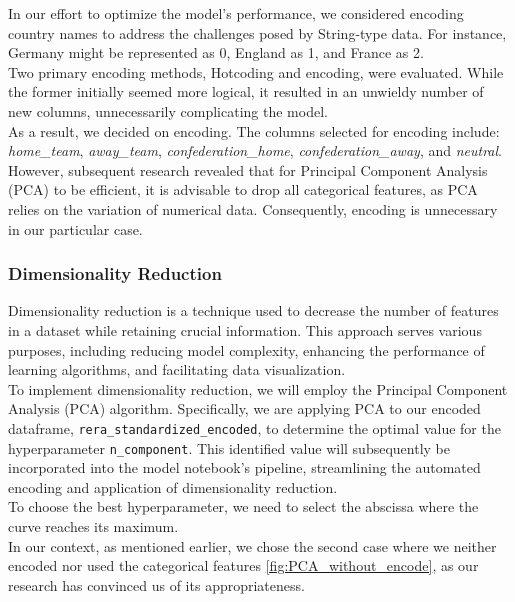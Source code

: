 \documentclass[a4paper,12pt]{article}
\begin{document}
In our effort to optimize the model's performance, we considered encoding country names to address the challenges posed by String-type data. For instance, Germany might be represented as 0, England as 1, and France as 2.\\

Two primary encoding methods, Hotcoding and encoding, were evaluated. While the former initially seemed more logical, it resulted in an unwieldy number of new columns, unnecessarily complicating the model.\\

As a result, we decided on encoding. The columns selected for encoding include: \textit{home\_team}, \textit{away\_team}, \textit{confederation\_home}, \textit{confederation\_away}, and \textit{neutral}.\\

However, subsequent research revealed that for Principal Component Analysis (PCA) to be efficient, it is advisable to drop all categorical features, as PCA relies on the variation of numerical data. Consequently, encoding is unnecessary in our particular case.


\subsubsection{Dimensionality Reduction}

Dimensionality reduction is a technique used to decrease the number of features in a dataset while retaining crucial information. This approach serves various purposes, including reducing model complexity, enhancing the performance of learning algorithms, and facilitating data visualization.\\

To implement dimensionality reduction, we will employ the Principal Component Analysis (PCA) algorithm. Specifically, we are applying PCA to our encoded dataframe, \texttt{rera\_standardized\_encoded}, to determine the optimal value for the hyperparameter \texttt{n\_component}. This identified value will subsequently be incorporated into the model notebook's pipeline, streamlining the automated encoding and application of dimensionality reduction.\\

To choose the best hyperparameter, we need to select the abscissa where the curve reaches its maximum.\\

In our context, as mentioned earlier, we chose the second case where we neither encoded nor used the categorical features \ref{fig:PCA_without_encode}, as our research has convinced us of its appropriateness.\\
\end{document}
